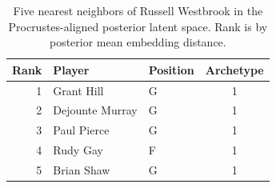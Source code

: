 \begin{table}[htbp]
  \centering\small
  \begin{tabular}{rllc}
    \toprule
    Rank & Player & Position & Archetype \\
    \midrule
    1 & Grant Hill & G & 1 \\
    2 & Dejounte Murray & G & 1 \\
    3 & Paul Pierce & G & 1 \\
    4 & Rudy Gay & F & 1 \\
    5 & Brian Shaw & G & 1 \\
    \bottomrule
  \end{tabular}
  \caption{Five nearest neighbors of Russell Westbrook in the Procrustes-aligned posterior latent space. Rank is by posterior mean embedding distance.}
  \label{tab:Russell_Westbrook_neighbors}
\end{table}

